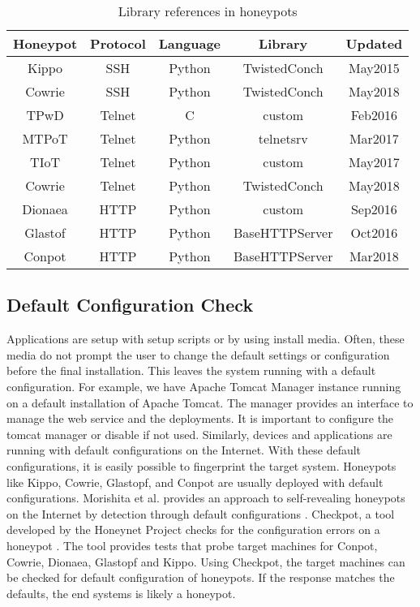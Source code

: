\begin{table}
\begin{tabular}{||c c c c c||} 
 \hline
 Honeypot & Protocol & Language & Library & Updated \\ [0.5ex] 
 \hline
 Kippo  & SSH    & Python &  TwistedConch & May2015 \\ 
 Cowrie & SSH    & Python &  TwistedConch & May2018 \\
 TPwD   & Telnet & C      &  custom       & Feb2016 \\
 MTPoT  & Telnet & Python &  telnetsrv    & Mar2017 \\
 TIoT   & Telnet & Python &  custom       & May2017 \\
 Cowrie & Telnet & Python &  TwistedConch & May2018 \\
 Dionaea& HTTP   & Python &  custom       & Sep2016 \\
 Glastof& HTTP   & Python &  BaseHTTPServer& Oct2016 \\
 Conpot & HTTP   & Python &  BaseHTTPServer& Mar2018 \\ [1ex] 
 \hline
\end{tabular}
\caption{Library references in honeypots}
\label{library}
\end{table}

\subsection{Default Configuration Check}
Applications are setup with setup scripts or by using install media. Often, these media do not prompt the user to change the default settings or configuration before the final installation. This leaves the system running with a default configuration. For example, we have Apache Tomcat Manager instance running on a default installation of Apache Tomcat. The manager provides an interface to manage the web service and the deployments. It is important to configure the tomcat manager or disable if not used. Similarly, devices and applications are running with default configurations on the Internet. With these default configurations, it is easily possible to fingerprint the target system. Honeypots like Kippo, Cowrie, Glastopf, and Conpot are usually deployed with default configurations. Morishita et al.  provides an approach to self-revealing honeypots on the Internet by detection through default configurations \cite{morishita}.  Checkpot, a tool developed by the Honeynet Project checks for the configuration errors on a honeypot \cite{Checkpot}. The tool provides tests that probe target machines for Conpot, Cowrie, Dionaea, Glastopf and Kippo. Using Checkpot, the target machines can be checked for default configuration of honeypots. If the response matches the defaults, the end systems is likely a honeypot.

